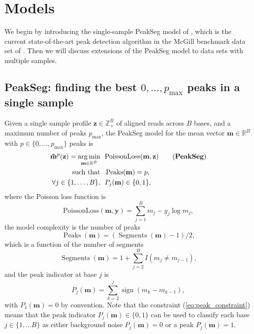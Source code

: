 \documentclass{article} %
\DeclareMathOperator*{\argmin}{arg\,min}
\DeclareMathOperator*{\Peaks}{Peaks}
\DeclareMathOperator*{\Segments}{Segments}
\newcommand{\sign}{\operatorname{sign}}
\newcommand{\RR}{\mathbb R}
\newcommand{\ZZ}{\mathbb Z}
\begin{document}

\section{Models}

We begin by introducing the single-sample PeakSeg model of
\citet{HOCKING-PeakSeg}, which is the current state-of-the-art peak
detection algorithm in the McGill benchmark data set of
\citet{hocking2014visual}. Then we will discuss extensions of the
PeakSeg model to data sets with multiple samples.

\subsection{PeakSeg: finding the best $0,\dots,p_{\text{max}}$ peaks
  in a single sample}

Given a single sample profile $\mathbf z\in\ZZ_+^B$ of aligned reads
across $B$ bases, and a maximum number of peaks $p_{\text{max}}$, the
PeakSeg model for the mean vector $\mathbf m\in\RR^B$ with $p\in\{0,
\dots, p_{\text{max}}\}$ peaks is
\begin{align}
  \label{PeakSeg}
  \mathbf{\tilde m}^p(\mathbf z)  =
    \argmin_{\mathbf m\in\RR^{B}} &\ \ 
    \text{PoissonLoss}(\mathbf m, \mathbf z) 
    \tag{\textbf{PeakSeg}}
\\
    \text{such that} &\ \  \Peaks(\mathbf m)=p,  \\
     \forall j\in\{1, \dots, B\}, &\ \ P_j(\mathbf m) \in\{0, 1\},
    \label{eq:peak_constraint}
\end{align}
where the Poisson loss function is
\begin{equation}\label{eq:rho}
  \text{PoissonLoss}(\mathbf m, \mathbf y)= \sum_{j=1}^B m_j - y_j \log m_j,
\end{equation} 
the model complexity is the number of peaks
\begin{equation}
  \Peaks(\mathbf m)=(\Segments(\mathbf m)-1)/2,
\end{equation}
which is a function of the number of segments
\begin{equation}
  \Segments(\mathbf m)=1+\sum_{j=2}^B I(m_j \neq m_{j-1}),
\end{equation}
and the peak indicator at base $j$ is
\begin{equation}
  \label{eq:peaks}
  P_j(\mathbf m) = \sum_{k=2}^j \sign( m_{k} - m_{k-1} ),
\end{equation}
with $P_1(\mathbf m)=0$ by convention. Note that the constraint
(\ref{eq:peak_constraint}) means that the peak indicator $P_j(\mathbf
m)\in\{0, 1\}$ can be used to classify each base $j\in\{1,\dots B\}$
as either background noise $P_j(\mathbf m)=0$ or a peak $P_j(\mathbf
m)=1$.
\end{document}
